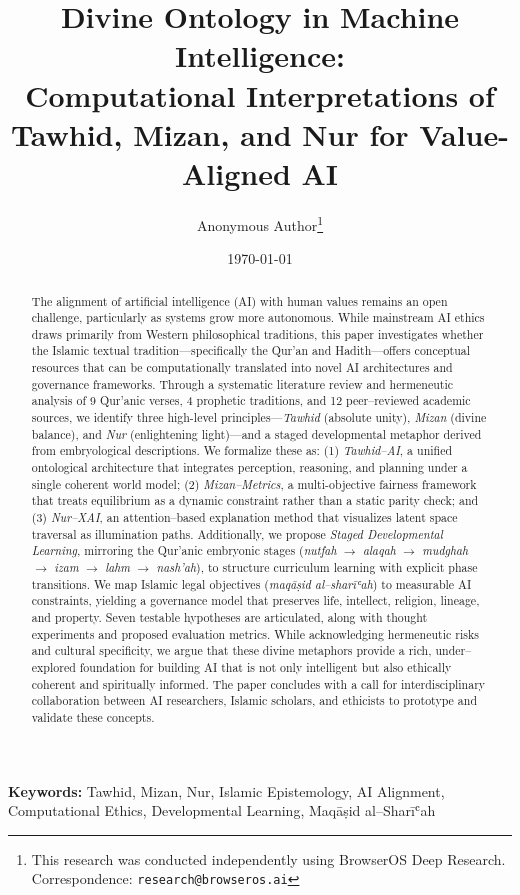 \documentclass[12pt,twocolumn]{article}
\title{Divine Ontology in Machine Intelligence: \\ Computational Interpretations of Tawhid, Mizan, and Nur for Value-Aligned AI}
\author{Anonymous Author\thanks{This research was conducted independently using BrowserOS Deep Research. Correspondence: \texttt{research@browseros.ai}}}
\date{\today}
\begin{document}
\maketitle
\begin{abstract}
\noindent The alignment of artificial intelligence (AI) with human values remains an open challenge, particularly as systems grow more autonomous. While mainstream AI ethics draws primarily from Western philosophical traditions, this paper investigates whether the Islamic textual tradition—specifically the Qur'an and Hadith—offers conceptual resources that can be computationally translated into novel AI architectures and governance frameworks. Through a systematic literature review and hermeneutic analysis of 9 Qur'anic verses, 4 prophetic traditions, and 12 peer--reviewed academic sources, we identify three high-level principles—\emph{Tawhid} (absolute unity), \emph{Mizan} (divine balance), and \emph{Nur} (enlightening light)—and a staged developmental metaphor derived from embryological descriptions. We formalize these as: (1) \emph{Tawhid--AI}, a unified ontological architecture that integrates perception, reasoning, and planning under a single coherent world model; (2) \emph{Mizan--Metrics}, a multi-objective fairness framework that treats equilibrium as a dynamic constraint rather than a static parity check; and (3) \emph{Nur--XAI}, an attention--based explanation method that visualizes latent space traversal as illumination paths. Additionally, we propose \emph{Staged Developmental Learning}, mirroring the Qur'anic embryonic stages (\emph{nutfah} $\to$ \emph{alaqah} $\to$ \emph{mudghah} $\to$ \emph{izam} $\to$ \emph{lahm} $\to$ \emph{nash'ah}), to structure curriculum learning with explicit phase transitions. We map Islamic legal objectives (\emph{maqāṣid al--sharīʿah}) to measurable AI constraints, yielding a governance model that preserves life, intellect, religion, lineage, and property. Seven testable hypotheses are articulated, along with thought experiments and proposed evaluation metrics. While acknowledging hermeneutic risks and cultural specificity, we argue that these divine metaphors provide a rich, under--explored foundation for building AI that is not only intelligent but also ethically coherent and spiritually informed. The paper concludes with a call for interdisciplinary collaboration between AI researchers, Islamic scholars, and ethicists to prototype and validate these concepts.
\end{abstract}
\vspace{5mm}
\noindent\textbf{Keywords:} Tawhid, Mizan, Nur, Islamic Epistemology, AI Alignment, Computational Ethics, Developmental Learning, Maqāṣid al--Sharīʿah
\vspace{5mm}
\end{document}
